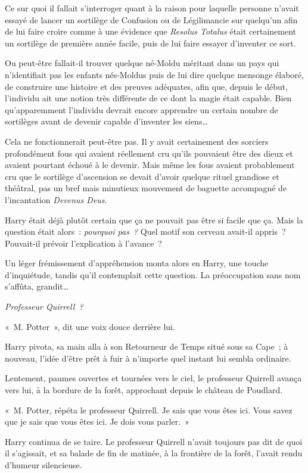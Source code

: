 Ce sur quoi il fallait s'interroger quant à la raison pour laquelle personne n'avait essayé de lancer un sortilège de Confusion ou de Légilimancie sur quelqu'un afin de lui faire croire comme à une évidence que \emph{Resolus Totalus} était certainement un sortilège de première année facile, puis de lui faire essayer d'inventer ce sort.

Ou peut-être fallait-il trouver quelque né-Moldu méritant dans un pays qui n'identifiait pas les enfants nés-Moldus puis de lui dire quelque mensonge élaboré, de construire une histoire et des preuves adéquates, afin que, depuis le début, l'individu ait une notion très différente de ce dont la magie était capable. Bien qu'apparemment l'individu devrait encore apprendre un certain nombre de sortilèges avant de devenir capable d'inventer les siens…

Cela ne fonctionnerait peut-être pas. Il y avait certainement des sorciers profondément fous qui avaient réellement cru qu'ils pouvaient être des dieux et avaient pourtant échoué à le devenir. Mais même les fous avaient probablement cru que le sortilège d'ascension se devait d'avoir quelque rituel grandiose et théâtral, pas un bref mais minutieux mouvement de baguette accompagné de l'incantation \emph{Devenus Deus}.

Harry était déjà plutôt certain que ça ne pouvait pas être si facile que ça. Mais la question était alors~: \emph{pourquoi pas~?} Quel motif son cerveau avait-il appris~? Pouvait-il prévoir l'explication à l'avance~?

Un léger frémissement d'appréhension monta alors en Harry, une touche d'inquiétude, tandis qu'il contemplait cette question. La préoccupation sans nom s'affûta, grandit…

\emph{Professeur Quirrell~?}

«~M. Potter~», dit une voix douce derrière lui.

Harry pivota, sa main alla à son Retourneur de Temps situé sous sa Cape~; à nouveau, l'idée d'être prêt à fuir à n'importe quel instant lui sembla ordinaire.

Lentement, paumes ouvertes et tournées vers le ciel, le professeur Quirrell avança vers lui, à la bordure de la forêt, approchant depuis le château de Poudlard.

«~M. Potter, répéta le professeur Quirrell. Je sais que vous êtes ici. Vous savez que je sais que vous êtes ici. Je dois vous parler.~»

Harry continua de se taire. Le professeur Quirrell n'avait toujours pas dit de quoi il s'agissait, et sa balade de fin de matinée, à la frontière de la forêt, l'avait rendu d'humeur silencieuse.

